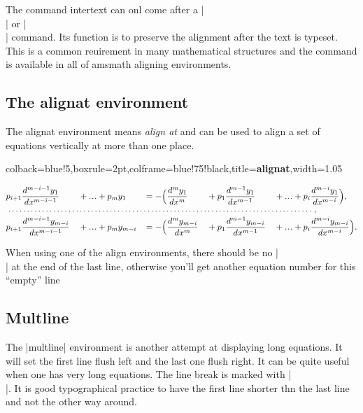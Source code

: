 The command intertext can onl come after a |\\| or |\\| command. Its function is to preserve the alignment after the text is typeset. This is a common reuirement in many mathematical structures and the command is available in all of amsmath aligning environments.






\subsection{The alignat environment}
The alignat environment means \emph{align at} and can be used to align a set of equations vertically at more than one place.



\begin{tcblisting}{colback=blue!5,boxrule=2pt,colframe=blue!75!black,title=\textbf{alignat},width=1.05\textwidth}
\renewcommand{\dotsb}{\ldots}			%
\renewcommand{\dotsbsmall}{\ldot\!\ldot\!\ldot}
\renewcommand{\ldot}{\mathbin{.}}			%
\renewcommand{\nobf}[1]{\no \textbf{#1}}	

\begin{alignat*}{5}
  &p_{i+1}\dfrac{d^{m-i-1}y_1}{dx^{m-i-1}} &&+ \dotsbsmall +p_{m}y_1
  && = -\Big(\dfrac{d^{m}y_1}{dx^{m}} &&+p_1\dfrac{d^{m-1}y_1}{dx^{m-1}}
  &&+ \dotsbsmall +p_{i}\dfrac{d^{m-i}y_1}{dx^{m-i}}\Big), \\
\multispan{10}{\makebox[36em]{\dotfill},}\\
 &p_{i+1}\dfrac{d^{m-i-1}y_{m-i}}{dx^{m-i-1}} &&+ \dotsbsmall +p_{m}y_{m-i}\!
 &&= -\Big(\dfrac{d^{m}y_{m-i}}{dx^{m}} &&+ p_1\dfrac{d^{m-1}y_{m-i}}{dx^{m-1}}
 &&+ \dotsbsmall +p_{i}\dfrac{d^{m-i}y_{m-i}}{dx^{m-i}}\Big).
\end{alignat*}
\end{tcblisting}



When using one of the align environments, there should be no |\\| at the end of the
last line, otherwise you’ll get another equation number for this ``empty''  line


\clearpage
\subsection{Multline}
The |multline| environment is another attempt at displaying long equations. It will set the first line flush left and the last one flush right. It can be quite useful when one has very long equations. The line break is marked with |\\|. It is good typographical practice to have the first line shorter thn the last line and not the other way around.

